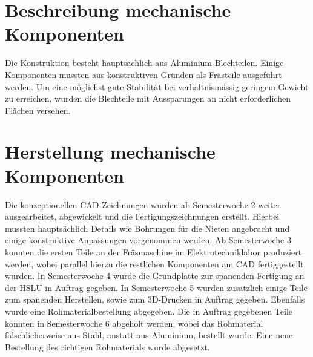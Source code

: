 \section{Beschreibung mechanische Komponenten}
Die Konstruktion besteht hauptsächlich aus Aluminium-Blechteilen. Einige Komponenten mussten aus konstruktiven Gründen als Frästeile ausgeführt werden.
Um eine möglichst gute Stabilität bei verhältnismässig geringem Gewicht zu erreichen, wurden die Blechteile mit Aussparungen an nicht erforderlichen Flächen versehen.


\section{Herstellung mechanische Komponenten}
Die konzeptionellen CAD-Zeichnungen wurden ab Semesterwoche 2 weiter ausgearbeitet, abgewickelt und die Fertigungszeichnungen erstellt. Hierbei mussten hauptsächlich Details wie Bohrungen für die Nieten angebracht und einige konstruktive Anpassungen vorgenommen werden. Ab Semesterwoche 3 konnten die ersten Teile an der Fräsmaschine im Elektrotechniklabor produziert werden, wobei parallel  hierzu die restlichen Komponenten am CAD fertiggestellt wurden.
In Semesterwoche 4 wurde die Grundplatte zur spanenden Fertigung an der HSLU in Auftrag gegeben.
In Semesterwoche 5 wurden zusätzlich einige Teile zum spanenden Herstellen, sowie zum 3D-Drucken in Auftrag gegeben. Ebenfalls wurde eine Rohmaterialbestellung abgegeben.
Die in Auftrag gegebenen Teile konnten in Semesterwoche 6 abgeholt werden, wobei das  Rohmaterial fälschlicherweise aus Stahl, anstatt aus Aluminium, bestellt wurde. Eine neue Bestellung des richtigen Rohmaterials wurde abgesetzt.
